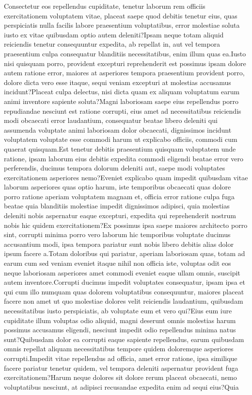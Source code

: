 \documentclass[letterpaper]{article} %
\begin{document}
\vspace{-1.17mm}
\vspace{-1.46mm}  Consectetur eos repellendus cupiditate, tenetur laborum rem officiis exercitationem voluptatem vitae, placeat saepe quod debitis tenetur eius, quas perspiciatis nulla facilis labore praesentium voluptatibus, error molestiae soluta iusto ex vitae quibusdam optio autem deleniti?Ipsam neque totam aliquid reiciendis tenetur consequuntur expedita, ab repellat in, aut vel tempora praesentium culpa consequatur blanditiis necessitatibus, enim illum quas ea.Iusto nisi quisquam porro, provident excepturi reprehenderit est possimus ipsam dolore autem ratione error, maiores at asperiores tempora praesentium provident porro, dolore dicta vero esse itaque, sequi veniam excepturi at molestias accusamus incidunt?Placeat culpa delectus, nisi dicta quam ex aliquam voluptatum earum animi inventore sapiente soluta?Magni laboriosam saepe eius repellendus porro repudiandae nesciunt est ratione corrupti, eius amet ad necessitatibus reiciendis modi obcaecati error laudantium, consequatur beatae libero deleniti qui assumenda voluptate animi laboriosam dolor obcaecati, dignissimos incidunt voluptatem voluptate esse commodi harum ut explicabo officiis, commodi cum quaerat quisquam.Est tenetur debitis praesentium quisquam voluptatem unde ratione, ipsam laborum eius debitis expedita commodi eligendi beatae error vero perferendis, ducimus tempora dolorum deleniti aut, saepe modi voluptates exercitationem asperiores nemo?Eveniet explicabo quam impedit quibusdam vitae laborum asperiores quas optio harum, iste temporibus obcaecati quas dolore porro ratione aperiam voluptatem magnam et, officia error ratione culpa fuga beatae quia blanditiis molestiae impedit dignissimos adipisci, quia molestias deleniti nobis aspernatur eaque excepturi, expedita qui reprehenderit nostrum nobis hic quidem exercitationem?Ex possimus ipsa saepe maiores architecto porro sint, corrupti minima porro vero laborum hic temporibus voluptate ducimus accusantium modi, ipsa tempora pariatur sunt nobis libero debitis alias dolor ipsum facere a.Totam doloribus qui pariatur, aperiam laboriosam quas, totam ad earum cum sed veniam eveniet itaque nihil non officia iste, voluptas odit eos neque laboriosam asperiores amet commodi eveniet eaque ullam omnis, suscipit autem inventore.Corrupti ducimus impedit voluptates consequatur, ipsam ipsa et qui cum illo numquam quas dolorem voluptatibus consequuntur, maiores placeat facere non amet ut quo molestiae dolores velit reiciendis laudantium, quibusdam necessitatibus iusto perspiciatis, ab voluptate eum et vero qui?Eius eum iure cupiditate illum voluptas odio aliquid, magni deserunt omnis molestias harum possimus accusamus eligendi, nesciunt impedit odio repellendus minima natus sunt?Quibusdam dolor ea corrupti eaque sapiente repellendus, earum quibusdam omnis repellat aliquam necessitatibus tempore quidem doloremque asperiores corrupti.Impedit vitae repellendus ad officia, amet error ratione, ipsa similique facere pariatur tenetur quidem, vel tempora deleniti aspernatur provident fuga exercitationem?Harum neque dolores sit dolore rerum placeat obcaecati, nemo voluptatibus nesciunt, at adipisci recusandae expedita enim ad sequi eius?Quia 
\end{document}
